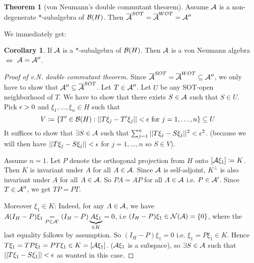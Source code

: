 \documentclass[10pt,english,a4paper]{article}
\theoremstyle{definition}
\newtheorem*{theorem}{Theorem}
\newtheorem*{corollary}{Corollary}
\begin{document}
\begin{theorem}[von Neumann's double commutant theorem]
    Assume $\mathcal{A}$ is a non-degenerate $*$-subalgebra of $\mathcal{B}(H)$. 
Then $\overline{\mathcal{A}}^{SOT} = \overline{\mathcal{A}}^{WOT} = \mathcal{A}''$ 
\end{theorem}
We immediately get:
\begin{corollary}
    If $\mathcal{A}$ is a $*$-subalgebra of $\mathcal{B}(H)$. Then $\mathcal{A}$ is a von
Neumann algebra $\iff$ $\mathcal{A} = \mathcal{A}''$.
\end{corollary}
\begin{proof}[Proof of v.N. double commutant theorem]
    Since $\overline{\mathcal{A}}^{SOT} = \overline{\mathcal{A}}^{WOT} \subseteq \mathcal{A}''$, we 
only have to show that $\mathcal{A}'' \subseteq \overline{\mathcal{A}}^{SOT}$.
Let $T \in \mathcal{A}''$. Let $U$ be any SOT-open neighborhood of $T$. We have 
to show that there exists $S \in \mathcal{A}$ such that $S \in U$. Pick 
$\epsilon > 0$ and $\xi_1,\ldots, \xi_n \in H$ such that 
\[ V\coloneqq \{ T' \in \mathcal{B}(H) : ||T\xi_j - T'\xi_j|| < \epsilon \text{ for }j
=1,\ldots,n \} \subseteq U\]
It suffices to show that $\exists S \in \mathcal{A}$ such that 
$\sum_{j=1}^{n} ||T\xi_j - S\xi_j||^2 < \epsilon^2$.
(because we will then have $||T\xi_j - S\xi_j || < \epsilon$ for $j=1,\ldots, n$
so $S \in V$).

Assume $n=1$. Let $P$ denote the orthogonal projection from $H$ onto
$[\mathcal{A}\xi_1] \coloneqq K$. Then $K$ is invariant under $A$ for all $A \in \mathcal{A}$.
Since $\mathcal{A}$ is self-adjoint, $K^{\perp}$ is also invariant under $A$ for all $A
\in \mathcal{A}$. So $PA = AP$ for all $A \in \mathcal{A}$ i.e. $P\in \mathcal{A}'$.
Since $T \in \mathcal{A}''$, we get $TP=PT$. 

Moreover $\xi_1 \in K$:
Indeed, for any $A \in \mathcal{A}$, we have $A(I_H - P)\xi_1 \underset{P\in \mathcal{A}'}{=}
(I_H-P)\underbrace{A\xi_1}_{\in
K} = 0$, i.e $(I_H -P)\xi_1 \in \mathcal{N}(\mathcal{A}) = \{0\}$, where the last equality
follows by assumption. So $(I_H - P)\xi_1 = 0$ i.e. $\xi_1 = P\xi_1 \in K$.
Hence $T\xi_1 = TP\xi_1 = PT\xi_1 \in K = [\mathcal{A}\xi_1]$.
($\mathcal{A}\xi_1$ is a subspace), 
so $\exists S \in \mathcal{A} $ such that $||T\xi_1 - S\xi_1|| < \epsilon$ as wanted in this case.


\end{proof}
\end{document}
